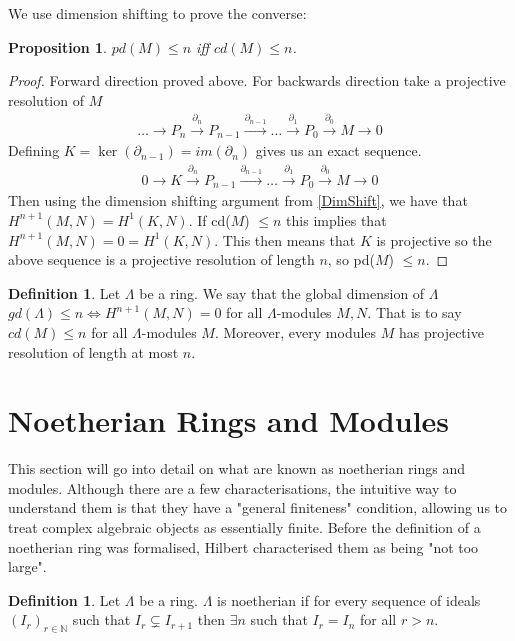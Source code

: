 \documentclass[12pt]{book}
\newtheorem{proposition}[theorem]{Proposition}
\theoremstyle{definition}
\newtheorem{definition}[theorem]{Definition}
\begin{document}
We use dimension shifting to prove the converse:

\begin{proposition}
     $pd(M) \leq n$ iff $cd(M) \leq n$.
\end{proposition}
\begin{proof}
    Forward direction proved above. For backwards direction take a projective resolution of $M$ 
    \begin{align*}
        \dots \rightarrow P_n \xrightarrow{\partial_n} P_{n-1} \xrightarrow{\partial_{n-1}} \dots \xrightarrow{\partial_1} P_0 \xrightarrow{\partial_0} M \rightarrow 0
    \end{align*}
    Defining $K = \ker(\partial_{n-1}) = im(\partial_n)$ gives us an exact sequence.
    \begin{align*}
        0 \rightarrow K  \xrightarrow{\partial_n} P_{n-1} \xrightarrow{\partial_{n-1}} \dots \xrightarrow{\partial_1} P_0 \xrightarrow{\partial_0} M \rightarrow 0
    \end{align*}
    Then using the dimension shifting argument from \ref{DimShift}, we have that $H^{n+1}(M,N) = H^1(K,N)$. If cd($M$) $\leq n$ this implies that $H^{n+1}(M,N) = 0 = H^1(K,N)$. This then means that $K$ is projective so the above sequence is a projective resolution of length $n$, so pd($M$) $\leq n$. 
\end{proof}

\begin{definition}
    Let $\Lambda$ be a ring. We say that the global dimension of $\Lambda$ $gd(\Lambda) \leq n \iff H^{n+1}(M,N) = 0$ for all $\Lambda$-modules $M,N$. That is to say $cd(M) \leq n$ for all $\Lambda$-modules $M$. Moreover, every modules $M$ has projective resolution of length at most $n$. 
\end{definition}

\section{Noetherian Rings and Modules}

This section will go into detail on what are known as noetherian rings and modules. Although there are a few characterisations, the intuitive way to understand them is that they have a "general finiteness" condition, allowing us to treat complex algebraic objects as essentially finite. Before the definition of a noetherian ring was formalised, Hilbert characterised them as being "not too large". 
\begin{definition}
    Let $\Lambda$ be a ring. $\Lambda$ is noetherian if for every sequence of ideals $(I_r)_{r \in \mathbb{N}}$ such that $I_r \subsetneq I_{r+1}$ then $\exists n$ such that $I_r = I_n$ for all $r > n$. 
\end{definition}
\end{document}
